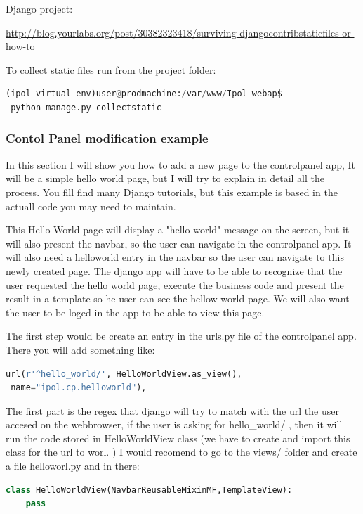 Django project:

\url{http://blog.yourlabs.org/post/30382323418/surviving-djangocontribstaticfiles-or-how-to}

To collect static files run from the project folder:

\begin{lstlisting}[language=Python,firstnumber=1]
 (ipol_virtual_env)user@prodmachine:/var/www/Ipol_webap$ 
 python manage.py collectstatic
\end{lstlisting}


\subsubsection{Contol Panel modification example}

In this section I will show you how to add a new page to the controlpanel app, 
It will be a simple hello world page, but I will try to explain in detail all the process.
You fill find many Django tutorials, but this example is based in the actuall code you may need to maintain.

This Hello World page will display a "hello world" message on the screen, but it will also present the navbar, so the user can navigate in the controlpanel app. 
It will also need a helloworld entry in the navbar so the user can navigate to this newly created page. The django app will have to be able to recognize that the user requested the hello world page, execute the business code and present the result in a template so he user can see the hellow world page.
We will also want the user to be loged in the app to be able to view this page.
 
The first step would be create an entry in the urls.py file of the controlpanel app.
There you will add something like:

\begin{lstlisting}[language=Python,firstnumber=1]
url(r'^hello_world/', HelloWorldView.as_view(),
 name="ipol.cp.helloworld"),
\end{lstlisting}

The first part is the regex that django will try to match with the url the user accesed on the webbrowser, if the user is asking for hello\_world/ , then it will run the code stored in HelloWorldView class (we have to create and import this class for the url to worl. )
I would recomend to go to the views/ folder and create a file helloworl.py and in there:

\begin{lstlisting}[language=Python,firstnumber=1]
class HelloWorldView(NavbarReusableMixinMF,TemplateView):
	pass
\end{lstlisting}

